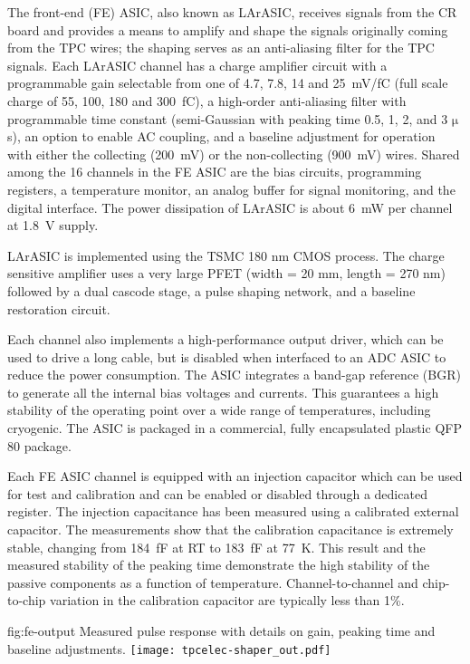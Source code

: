 
The front-end (FE) ASIC, also known as LArASIC, receives signals from the CR board and
provides a means to amplify and shape the signals originally coming from the TPC wires; the
shaping serves as an anti-aliasing filter for the TPC signals.
Each LArASIC channel has a charge amplifier circuit with a programmable
gain selectable from one of 4.7, 7.8, 14 and 25~mV/fC
(full scale charge of 55, 100, 180 and 300~fC),
a high-order anti-aliasing filter with programmable time
constant (semi-Gaussian with peaking time 0.5, 1, 2, and 3 $\mathrm{\mu}$s),
an option to enable AC coupling,
and a baseline adjustment for operation with either the collecting (200~mV) or the non-collecting (900~mV) wires.
Shared among the 16 channels in the FE ASIC are the bias circuits, programming registers,
a temperature monitor, an analog buffer for signal monitoring, and the digital interface.
The power dissipation of LArASIC is about 6~mW per channel at 1.8~V supply.

LArASIC is implemented using the TSMC 180 nm CMOS process.  The charge sensitive amplifier uses a very large PFET (width = 20 mm, length = 270 nm) followed by a dual cascode stage, a pulse shaping network, and a baseline restoration circuit.  

Each channel also implements a high-performance output driver,
which can be used to drive a long cable, but is disabled when interfaced to an ADC ASIC to reduce the power consumption.
The ASIC integrates a band-gap reference (BGR) to generate all the internal bias voltages and currents.
This guarantees a high stability of the operating point over a wide range of
temperatures, including cryogenic.
The ASIC is packaged in a commercial, fully encapsulated plastic QFP 80 package.

Each FE ASIC channel is equipped with an injection capacitor which can be used
for test and calibration and can be enabled or disabled through a
dedicated register. The injection capacitance has been measured using 
a calibrated external capacitor. The measurements show
that the calibration capacitance is extremely stable, changing from
184~fF at RT to 183~fF at 77~K. This result and the measured
stability of the peaking time demonstrate the high stability of the
passive components as a function of temperature. Channel-to-channel and chip-to-chip
variation in the calibration capacitor are typically less than 1\%. 

\begin{dunefigure}
{fig:fe-output}
{Measured pulse response with details on gain, peaking time and baseline adjustments.}
\texttt{[image: tpcelec-shaper\_out.pdf]}
\end{dunefigure}

